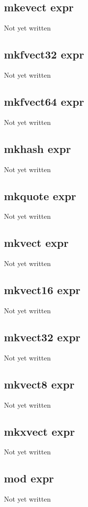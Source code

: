 \documentclass[a4paper,11pt]{article}
\begin{document}
{\subsection{\ttfamily mkevect expr}
Not yet written

\subsection{\ttfamily mkfvect32 expr}
Not yet written

\subsection{\ttfamily mkfvect64 expr}
Not yet written

\subsection{\ttfamily mkhash expr}
Not yet written

\subsection{\ttfamily mkquote expr}
Not yet written

\subsection{\ttfamily mkvect expr}
Not yet written

\subsection{\ttfamily mkvect16 expr}
Not yet written

\subsection{\ttfamily mkvect32 expr}
Not yet written

\subsection{\ttfamily mkvect8 expr}
Not yet written

\subsection{\ttfamily mkxvect expr}
Not yet written

\subsection{\ttfamily mod expr}
Not yet written

}
\end{document}
